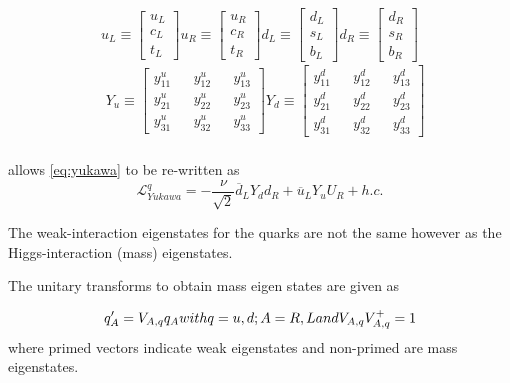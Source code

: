 \begin{equation}
  u_{L} \equiv \begin{bmatrix}u_{L}\\c_{L}\\t_{L}\end{bmatrix}
  u_{R} \equiv \begin{bmatrix}u_{R}\\c_{R}\\t_{R}\end{bmatrix}
  d_{L} \equiv \begin{bmatrix}d_{L}\\s_{L}\\b_{L}\end{bmatrix}
  d_{R} \equiv \begin{bmatrix}d_{R}\\s_{R}\\b_{R}\end{bmatrix}
  \label{eq:yukdef1}
\end{equation}
\begin{equation}
  \begin{split}
    &
    Y_{u} \equiv \begin{bmatrix}y^{u}_{11}&&y^{u}_{12}&&y^{u}_{13}\\y^{u}_{21}&&y^{u}_{22}&&y^{u}_{23}\\y^{u}_{31}&&y^{u}_{32}&&y^{u}_{33}\end{bmatrix}
    Y_{d} \equiv \begin{bmatrix}y^{d}_{11}&&y^{d}_{12}&&y^{d}_{13}\\y^{d}_{21}&&y^{d}_{22}&&y^{d}_{23}\\y^{d}_{31}&&y^{d}_{32}&&y^{d}_{33}\end{bmatrix}
    \\
  \end{split}
\end{equation}

allows \autoref{eq:yukawa} to be re-written as
\begin{equation}
  \mathcal{L}^{q}_{Yukawa} = -\frac{\nu}{\sqrt{2}}{\overline{d}_{L}Y_{d}d_{R} + \overline{u}_{L}Y_{u}U_{R} + h.c.}
\end{equation}


The weak-interaction eigenstates for the quarks are not the same however as the Higgs-interaction (mass) eigenstates.

The unitary transforms to obtain mass eigen states are given as

\begin{equation}
  q^{\prime}_{A} = V_{A,q}q_{A} $$with$$ q = u,d;   A = R,L $$and$$ V_{A,q}V^{+}_{A,q} = 1
  \label{eq:yukdef2}
\end{equation}
where primed vectors indicate weak eigenstates and non-primed are mass eigenstates.

